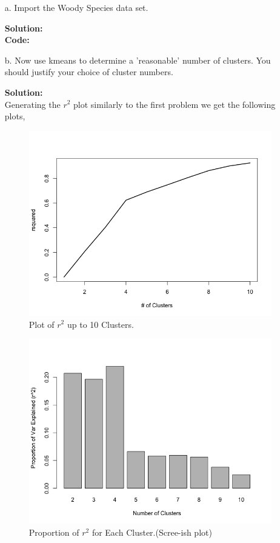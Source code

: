 \documentclass[12pt]{article}
\makeatletter
\theoremstyle{homework}
\newenvironment{exercise}[1]
{\def\@currentlabel{#1}\exercisecore}
{\endexercisecore}
\newcommand{\localhead}[1]{\par\smallskip\noindent\textbf{#1}\nobreak\\}%
\newcommand\solution{\localhead{Solution:}}
\makeatother
\begin{document}
\begin{exercise}{2}
  \begin{enumerate}
    \item[a.] Import the Woody Species data set.\\ 
    \solution 
    \textbf{Code:}
    \begin{center}
    
    \end{center}
    \vspace{.15in}
    
    \item[b.] Now use kmeans to determine a 'reasonable' number of clusters. You should justify your choice of cluster numbers.\\
    \solution Generating the $r^2$ plot similarly to the first problem we get the following plots, 
    \begin{figure}[H]
      \begin{center}
        \caption{Plot of $r^2$ up to 10 Clusters.}
      \includegraphics[width = .70\textwidth]{Rplot04.png}
      \end{center}
    \end{figure}
    \begin{figure}[H]
      \begin{center}
        \caption{Proportion of $r^2$ for Each Cluster.(Scree-ish plot)}
      \includegraphics[width = .70\textwidth]{Rplot05.png}

\end{center}
\end{figure}
\end{enumerate}
\end{exercise}
\end{document}
